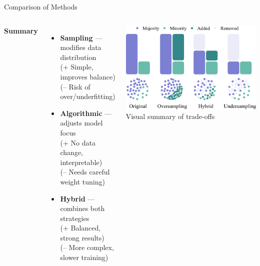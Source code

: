 \documentclass[serif, aspectratio=169]{beamer}
\begin{document}
\begin{frame}{Comparison of Methods}

\begin{columns}[c,onlytextwidth]
    \textbf{Summary}

    \begin{itemize}\itemsep0.6em
        \item \textbf{Sampling} — modifies data distribution\\
        \textcolor{green!60!black}{\small(+ Simple, improves balance)}\\
        \textcolor{red!70!black}{\small(– Risk of over/underfitting)}
        
        \item \textbf{Algorithmic} — adjusts model focus  \\
        \textcolor{green!60!black}{\small(+ No data change, interpretable)}\\
        \textcolor{red!70!black}{\small(– Needs careful weight tuning)}
        
        \item \textbf{Hybrid} — combines both strategies  \\
        \textcolor{green!60!black}{\small(+ Balanced, strong results)}  \\
        \textcolor{red!70!black}{\small(– More complex, slower training)}
    \end{itemize}

    \centering
    \includegraphics[width=0.9\linewidth]{pic/Figure_35.png}\\
    \scriptsize Visual summary of trade-offs
\end{columns}

\end{frame}
\end{document}
